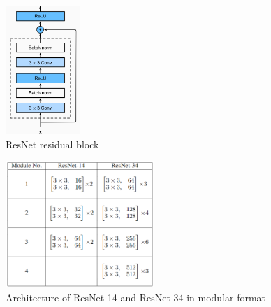 
\begin{figure}[!htb]
	\centering
	\includegraphics[width=0.25\textwidth]{../openreview/Capture.png}
	\caption{ResNet residual block}
	\label{fig:pic0}	
\end{figure}



\begin{figure}[!htb]
	\centering
	\includegraphics[width=0.5\textwidth]{../openreview/modular.png}
	\caption{Architecture of ResNet-14 and ResNet-34 in modular format}
	\label{fig:pic1}	
\end{figure}





